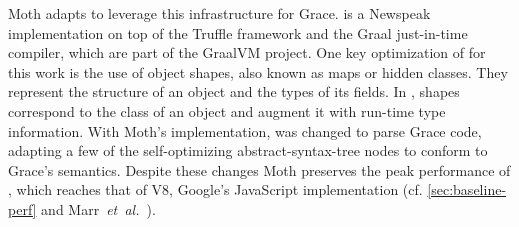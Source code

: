 Moth\citep{Roberts2017} adapts \SOMns\citep{SOMns} to leverage this infrastructure for Grace.
\SOMns is a Newspeak implementation\citep{Bracha:10:NS} on top of the Truffle framework and the Graal just-in-time compiler,
which are part of the GraalVM project.
One key optimization of \SOMns for this work is the use of
object shapes\citep{woss2014object},
also known as maps\citep{Self} or hidden classes.
They represent the structure of an object and the types of its fields.
In \SOMns, shapes correspond to the class of an object and augment it with
run-time type information.
%
%
With Moth's implementation,
\SOMns was changed to parse Grace code,
adapting a few of the self-optimizing abstract-syntax-tree nodes
to conform to Grace's semantics.
Despite these changes Moth
preserves the peak performance of \SOMns,
which reaches that of V8,
Google's JavaScript implementation
(cf. \cref{sec:baseline-perf} and Marr~\textit{et~al.}~\cite{Marr2016}).



%



